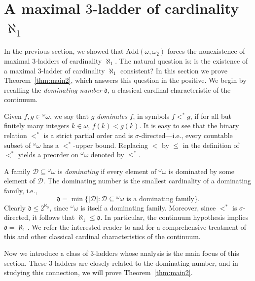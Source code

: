 \documentclass[]{amsart}
\theoremstyle{definition}
\theoremstyle{remark}
\begin{document}
\section{A maximal $3$-ladder of cardinality $\aleph_1$}\label{sec:dominating}

In the previous section, we showed that $\text{Add}(\omega, \omega_2)$ forces the nonexistence of maximal $3$-ladders of cardinality $\aleph_1$. The natural question is: is the existence of a maximal $3$-ladder of cardinality $\aleph_1$ consistent? In this section we prove Theorem~\ref{thm:main2}, which answers this question in the positive. We begin by recalling the \emph{dominating number} $\mathfrak{d}$, a classical cardinal characteristic of the continuum. 

Given $f,g \in {}^\omega \omega$, we say that $g$ \emph{dominates} $f$, in symbols $f <^* g$, if for all but finitely many integers $k \in \omega$, $f(k) < g(k)$. It is easy to see that the binary relation $<^*$ is a strict partial order and is $\sigma$-directed---i.e., every countable subset of ${}^\omega \omega$ has a $<^*$-upper bound. Replacing $<$ by $\le$ in the definition of $<^*$ yields a preorder on ${}^\omega \omega$ denoted by $\le^*$.

A family $\mathcal{D} \subseteq {}^\omega \omega$ is \emph{dominating} if  every element of ${}^\omega \omega$ is dominated by some element of $\mathcal{D}$. The dominating number is the smallest cardinality of a dominating family, i.e.,
\[
\mathfrak{d} = \min \{|\mathcal{D}| : \mathcal{D}\subseteq {}^\omega\omega \text{ is a dominating family}\}.
\]
Clearly $\mathfrak{d} \le 2^{\aleph_0}$, since ${}^\omega \omega$ is itself a dominating family. Moreover, since $<^*$ is $\sigma$-directed, it follows that $\aleph_1 \le \mathfrak{d}$. In particular, the continuum hypothesis implies $\mathfrak{d} = \aleph_1$. We refer the interested reader to \cite{MR2768685} and \cite{MR4917577} for a comprehensive treatment of this and other classical cardinal characteristics of the continuum.


Now we introduce a class of $3$-ladders whose analysis is the main focus of this section. These $3$-ladders are closely related to the dominating number, and in studying this connection, we will prove Theorem~\ref{thm:main2}.
\end{document}
